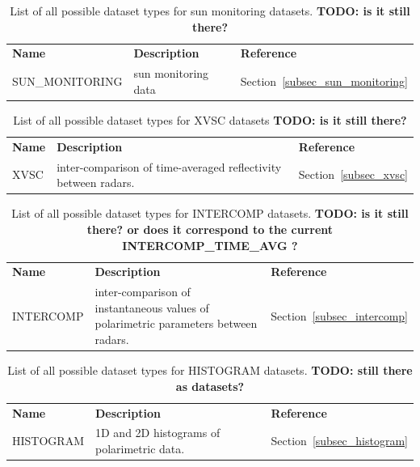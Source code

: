 \documentclass[a4paper,11pt,pdftex,twoside]{scrartcl}
\renewcommand{\bf}{\normalfont \bfseries}
\begin{document}
{{{\begin{table}[H]
\begin{tabularx}{\textwidth}{lXl}
\bf{Name}     & \bf{Description}                                & \bf{Reference}\\
SUN\_MONITORING & sun monitoring data & Section~\ref{subsec_sun_monitoring}\\
\end{tabularx}
\caption{List of all possible dataset types for sun monitoring datasets. {\bf TODO: is it still there?}}
\label{tab_datasets_sun_monitoring}
\end{table}


\begin{table}[H]
\begin{tabularx}{\textwidth}{lXl}
\bf{Name}     & \bf{Description}                                & \bf{Reference}\\
XVSC   & inter-comparison of time-averaged reflectivity between radars. & Section~\ref{subsec_xvsc}\\
\end{tabularx}
\caption{List of all possible dataset types for XVSC datasets {\bf TODO: is it still there?}  }
\label{tab_datasets_XVSC}
\end{table}

\begin{table}[H]
\begin{tabularx}{\textwidth}{lXl}
\bf{Name}     & \bf{Description}                                & \bf{Reference}\\
INTERCOMP   & inter-comparison of instantaneous values of polarimetric parameters between radars. & Section~\ref{subsec_intercomp}\\
\end{tabularx}
\caption{List of all possible dataset types for INTERCOMP datasets. {\bf TODO: is it still there? or does it correspond to the current INTERCOMP\_TIME\_AVG ?}}
\label{tab_datasets_INTERCOMP}
\end{table}

\begin{table}[H]
\begin{tabularx}{\textwidth}{lXl}
\bf{Name}     & \bf{Description}                                & \bf{Reference}\\
HISTOGRAM   & 1D and 2D histograms of polarimetric data. & Section~\ref{subsec_histogram}\\
\end{tabularx}
\caption{List of all possible dataset types for HISTOGRAM datasets. {\bf TODO: still there as datasets?}}
\label{tab_datasets_HISTOGRAM}
\end{table}

}}}
\end{document}
